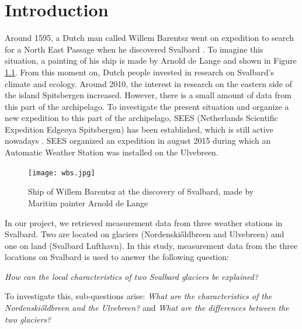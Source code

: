 \documentclass[11pt]{report}
\begin{document}
\newpage
\tableofcontents

\chapter{Introduction}\label{sec:intro}
\setcounter{page}{2}

Around 1595, a Dutch man called Willem Barentsz went on expedition to search for a North East Passage when he discovered Svalbard \cite{sval}. To imagine this situation, a painting of his ship is made by Arnold de Lange and shown in Figure \ref{fig:wbs}. From this moment on, Dutch people invested in research on Svalbard's climate and ecology. Around 2010, the interest in research on the eastern side of the island Spitsbergen increased. However, there is a small amount of data from this part of the archipelago. To investigate the present situation and organize a new expedition to this part of the archipelago, SEES (Netherlands Scientific Expedition Edge\o ya Spitsbergen) has been established, which is still active nowadays \cite{sees}. SEES organized an expedition in august 2015 during which an Automatic Weather Station was installed on the Ulvebreen.

\begin{figure}[h]
\texttt{[image: wbs.jpg]}
\centering{}
\caption{Ship of Willem Barentsz at the discovery of Svalbard, made by Maritim painter Arnold de Lange}
\label{fig:wbs}
\end{figure}

In our project, we retrieved measurement data from three weather stations in Svalbard. Two are located on glaciers (Nordenski\H{o}ldbreen and Ulvebreen) and one on land (Svalbard Lufthavn). In this study, measurement data from the three locations on Svalbard is used to answer the following question:

\textit{How can the local characteristics of two Svalbard glaciers be explained?}

To investigate this, sub-questions arise:
\textit{What are the characteristics of the Nordenski\H{o}ldbreen and the Ulvebreen?} and \textit{What are the differences between the two glaciers?}
\end{document}
